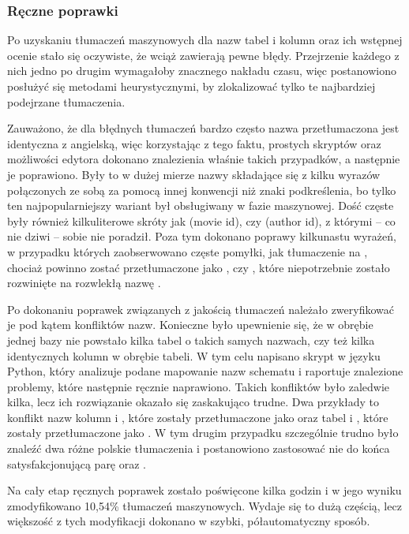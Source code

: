 \subsubsection{Ręczne poprawki}
Po uzyskaniu tłumaczeń maszynowych dla nazw tabel i kolumn oraz ich wstępnej ocenie stało się oczywiste, że wciąż zawierają pewne błędy. Przejrzenie każdego z nich jedno po drugim wymagałoby znacznego nakładu czasu, więc postanowiono posłużyć się metodami heurystycznymi, by zlokalizować tylko te najbardziej podejrzane tłumaczenia. 

Zauważono, że dla błędnych tłumaczeń bardzo często nazwa przetłumaczona jest identyczna z angielską, więc korzystając z tego faktu, prostych skryptów oraz możliwości edytora  dokonano znalezienia właśnie takich przypadków, a następnie je poprawiono. Były to w dużej mierze nazwy składające się z kilku wyrazów połączonych ze sobą za pomocą innej konwencji niż znaki podkreślenia, bo tylko ten najpopularniejszy wariant był obsługiwany w fazie maszynowej. Dość częste były również kilkuliterowe skróty jak  (movie id), czy  (author id), z którymi -- co nie dziwi --  sobie nie poradził. Poza tym dokonano poprawy kilkunastu wyrażeń, w przypadku których zaobserwowano częste pomyłki, jak tłumaczenie  na , chociaż powinno zostać przetłumaczone jako , czy , które niepotrzebnie zostało rozwinięte na rozwlekłą nazwę .

Po dokonaniu poprawek związanych z jakością tłumaczeń należało zweryfikować je pod kątem konfliktów nazw. Konieczne było upewnienie się, że w obrębie jednej bazy nie powstało kilka tabel o takich samych nazwach, czy też kilka identycznych kolumn w obrębie tabeli. W tym celu napisano skrypt w języku Python, który analizuje podane mapowanie nazw schematu i raportuje znalezione problemy, które następnie ręcznie naprawiono. Takich konfliktów było zaledwie kilka, lecz ich rozwiązanie okazało się zaskakująco trudne. Dwa przykłady to konflikt nazw kolumn  i , które zostały przetłumaczone jako  oraz tabel  i \mbox{}, które zostały przetłumaczone jako \mbox{}. W tym drugim przypadku szczególnie trudno było znaleźć dwa różne polskie tłumaczenia i postanowiono zastosować nie do końca satysfakcjonującą parę  oraz .

Na cały etap ręcznych poprawek zostało poświęcone kilka godzin i w jego wyniku zmodyfikowano 10,54\% tłumaczeń maszynowych. Wydaje się to dużą częścią, lecz większość z tych modyfikacji dokonano w szybki, półautomatyczny sposób.


